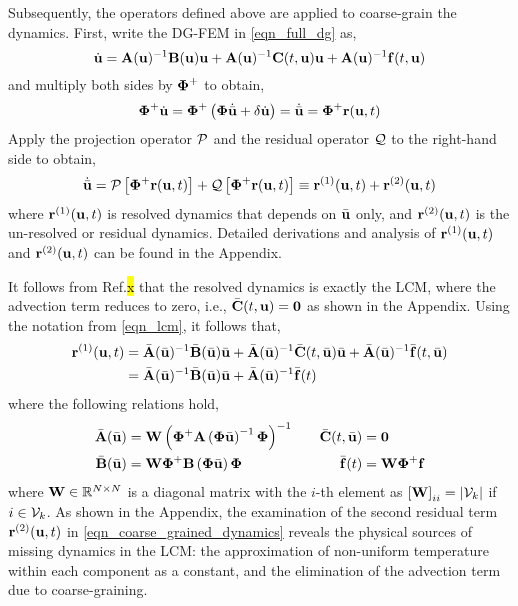 Subsequently, the operators defined above are applied to coarse-grain the dynamics. First, write the DG-FEM in \cref{eqn_full_dg} as,
\begin{equation}
    \dot{\mathbf{u}} = \mathbf{A}(\mathbf{u})^{-1}\mathbf{B}(\mathbf{u})\mathbf{u} + \mathbf{A}(\mathbf{u})^{-1}\mathbf{C}(t,\mathbf{u})\mathbf{u} + \mathbf{A}(\mathbf{u})^{-1}\mathbf{f}(t,\mathbf{u})\label{eqn_full_dg_rearranged}
\end{equation}
and multiply both sides by $\boldsymbol{\Phi}^{+}$ to obtain,
\begin{equation}
    \boldsymbol{\Phi}^{+}\dot{\mathbf{u}} = \boldsymbol{\Phi}^{+}\left(\boldsymbol{\Phi}\dot{\bar{\mathbf{u}}} + \delta\dot{\mathbf{u}}\right) = \dot{\bar{\mathbf{u}}} = \boldsymbol{\Phi}^{+}\mathbf{r}(\mathbf{u},t)
\end{equation}
Apply the projection operator $\mathcal{P}$ and the residual operator $\mathcal{Q}$ to the right-hand side to obtain,
\begin{equation}
    \dot{\bar{\mathbf{u}}} = \mathcal{P}\left[\boldsymbol{\Phi}^{+}\mathbf{r}(\mathbf{u},t)\right] + \mathcal{Q}\left[\boldsymbol{\Phi}^{+}\mathbf{r}(\mathbf{u},t)\right]\equiv \mathbf{r}^{(1)}(\mathbf{u},t) + \mathbf{r}^{(2)}(\mathbf{u},t)\label{eqn_coarse_grained_dynamics}
\end{equation}
where $\mathbf{r}^{(1)}(\mathbf{u},t)$ is resolved dynamics that depends on $\bar{\mathbf{u}}$ only, and $\mathbf{r}^{(2)}(\mathbf{u},t)$ is the un-resolved or residual dynamics. Detailed derivations and analysis of $\mathbf{r}^{(1)}(\mathbf{u},t)$ and $\mathbf{r}^{(2)}(\mathbf{u},t)$ can be found in the Appendix. 

It follows from Ref.\hl{x} that the resolved dynamics is exactly the LCM, where the advection term reduces to zero, i.e., $\bar{\mathbf{C}}(t,\mathbf{u}) = \boldsymbol{0}$ as shown in the Appendix. Using the notation from \cref{eqn_lcm}, it follows that,
\begin{align}
    \mathbf{r}^{(1)}(\mathbf{u},t) &= \bar{\mathbf{A}}(\bar{\mathbf{u}})^{-1}\bar{\mathbf{B}}(\bar{\mathbf{u}})\bar{\mathbf{u}} + \bar{\mathbf{A}}(\bar{\mathbf{u}})^{-1}\bar{\mathbf{C}}(t,\bar{\mathbf{u}})\bar{\mathbf{u}} + \bar{\mathbf{A}}(\bar{\mathbf{u}})^{-1}\bar{\mathbf{f}}(t,\bar{\mathbf{u}})\notag\\
    &= \bar{\mathbf{A}}(\bar{\mathbf{u}})^{-1}\bar{\mathbf{B}}(\bar{\mathbf{u}})\bar{\mathbf{u}} + \bar{\mathbf{A}}(\bar{\mathbf{u}})^{-1}\bar{\mathbf{f}}(t)\label{eqn_resolved_dynamics_no_advection}
\end{align}
where the following relations hold,
\begin{subequations}
    \begin{align}
        \bar{\mathbf{A}}(\bar{\mathbf{u}}) &= \mathbf{W}\left(\boldsymbol{\Phi}^{+}\mathbf{A}\left(\boldsymbol{\Phi}\bar{\mathbf{u}}\right)^{-1}\boldsymbol{\Phi}\right)^{-1} &\quad \bar{\mathbf{C}}(t,\bar{\mathbf{u}}) &= \boldsymbol{0} \\
        \bar{\mathbf{B}}(\bar{\mathbf{u}}) &= \mathbf{W}\boldsymbol{\Phi}^{+}\mathbf{B}\left(\boldsymbol{\Phi}\bar{\mathbf{u}}\right)\boldsymbol{\Phi} &\quad \bar{\mathbf{f}}(t) &= \mathbf{W}\boldsymbol{\Phi}^{+}\mathbf{f}
    \end{align}\label{eqn_coarse_grained_matrices}
\end{subequations}
where $\mathbf{W}\in\mathbb{R}^{N\times N}$ is a diagonal matrix with the $i$-th element as $\left[\mathbf{W}\right]_{ii} = \left|\mathcal{V}_k\right|$ if $i\in\mathcal{V}_k$. As shown in the Appendix, the examination of the second residual term $\mathbf{r}^{(2)}(\mathbf{u},t)$ in \cref{eqn_coarse_grained_dynamics} reveals the physical sources of missing dynamics in the LCM: the approximation of non-uniform temperature within each component as a constant, and the elimination of the advection term due to coarse-graining.

